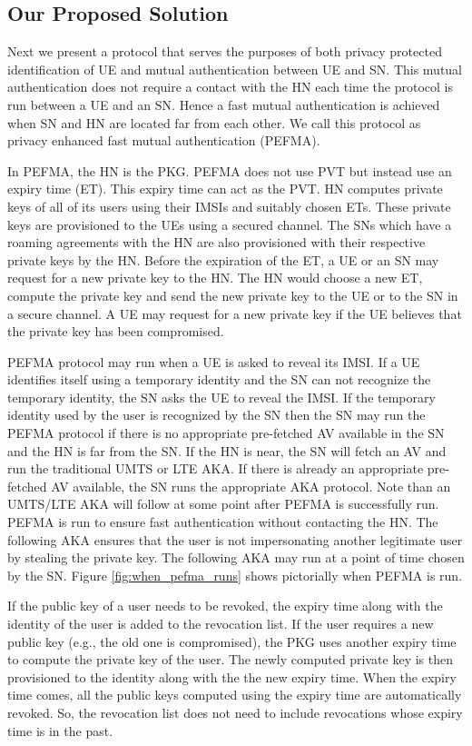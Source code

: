 \documentclass{river-journal}
\begin{document}
\subsection{Our Proposed Solution}
Next we present a protocol that serves the purposes of both privacy protected identification of UE and mutual authentication between UE and SN. This mutual authentication does not require a contact with the HN each time the protocol is run between a UE and an SN. Hence a fast mutual authentication is achieved when SN and HN are located far from each other. We call this protocol as privacy enhanced fast mutual authentication (PEFMA).


In PEFMA, the HN is the PKG. PEFMA does not use PVT but instead use an expiry time (ET). This expiry time can act as the PVT. HN computes private keys of all of its users using their IMSIs and suitably chosen ETs. These private keys are provisioned to the UEs using a secured channel. The SNs which have a roaming agreements with the HN are also provisioned with their respective private keys by the HN. Before the expiration of the ET, a UE or an SN may request for a new private key to the HN. The HN would choose a new ET, compute the private key and send the new private key to the UE or to the SN in a secure channel. A UE may request for a new private key if the UE believes that the private key has been compromised.


PEFMA protocol may run when a UE is asked to reveal its IMSI. If a UE identifies itself using a temporary identity and the SN can not recognize the temporary identity, the SN asks the UE to reveal the IMSI. If the temporary identity used by the user is recognized by the SN then the SN may run the PEFMA protocol if there is no appropriate pre-fetched AV available in the SN and the HN is far from the SN. If the HN is near, the SN will fetch an AV and run the traditional UMTS or LTE AKA. If there is already an appropriate pre-fetched AV available, the SN runs the appropriate AKA protocol. Note than an UMTS/LTE AKA will follow at some point after PEFMA is successfully run. PEFMA is run to ensure fast authentication without contacting the HN. The following AKA ensures that the user is not impersonating another legitimate user by stealing the private key. The following AKA may run at a point of time chosen by the SN. Figure \ref{fig:when_pefma_runs} shows pictorially when PEFMA is run.


If the public key of a user needs to be revoked, the expiry time along with the identity of the user is added to the revocation list. If the user requires a new public key (e.g., the old one is compromised), the PKG uses another expiry time to compute the private key of the user. The newly computed private key is then provisioned to the identity along with the the new expiry time. When the expiry time comes, all the public keys computed using the expiry time are automatically revoked. So, the revocation list does not need to include revocations whose expiry time is in the past. 
\end{document}
